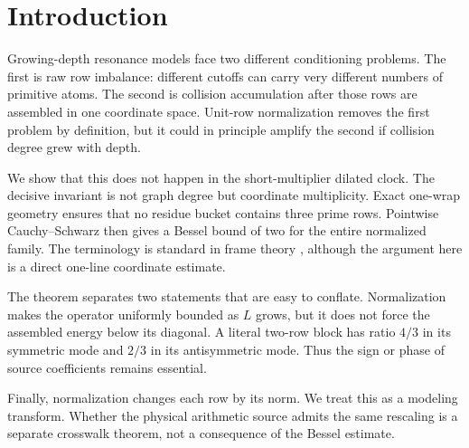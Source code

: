 \section{Introduction}

Growing-depth resonance models face two different conditioning problems.  The first is
raw row imbalance: different cutoffs can carry very different numbers of primitive
atoms.  The second is collision accumulation after those rows are assembled in one
coordinate space.  Unit-row normalization removes the first problem by definition,
but it could in principle amplify the second if collision degree grew with depth.

We show that this does not happen in the short-multiplier dilated clock.  The decisive
invariant is not graph degree but coordinate multiplicity.  Exact one-wrap geometry
ensures that no residue bucket contains three prime rows.  Pointwise Cauchy--Schwarz
then gives a Bessel bound of two for the entire normalized family.  The terminology is
standard in frame theory \citep{christensen2016,casazzakutyniok2013}, although the
argument here is a direct one-line coordinate estimate.

The theorem separates two statements that are easy to conflate.  Normalization makes
the operator uniformly bounded as $L$ grows, but it does not force the assembled energy
below its diagonal.  A literal two-row block has ratio $4/3$ in its symmetric mode and
$2/3$ in its antisymmetric mode.  Thus the sign or phase of source coefficients remains
essential.

Finally, normalization changes each row by its norm.  We treat this as a modeling
transform.  Whether the physical arithmetic source admits the same rescaling is a
separate crosswalk theorem, not a consequence of the Bessel estimate.
